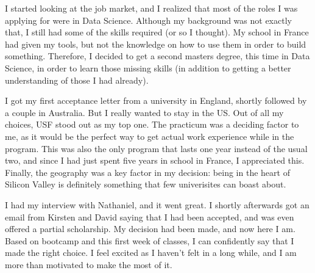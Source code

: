\documentclass[]{article}
\begin{document}
I started looking at the job market, and I realized that most of the roles I was applying for were in Data Science. Although my background was not exactly that, I still had some of the skills required (or so I thought). My school in France had given my tools, but not the knowledge on how to use them in order to build something. Therefore, I decided to get a second masters degree, this time in Data Science, in order to learn those missing skills (in addition to getting a better understanding of those I had already).

I got my first acceptance letter from a university in England, shortly followed by a couple in Australia. But I really wanted to stay in the US. Out of all my choices, USF stood out as my top one. The practicum was a deciding factor to me, as it would be the perfect way to get actual work experience while in the program. This was also the only program that lasts one year instead of the usual two, and since I had just spent five years in school in France, I appreciated this. Finally, the geography was a key factor in my decision: being in the heart of Silicon Valley is definitely something that few univerisites can boast about.

I had my interview with Nathaniel, and it went great. I shortly afterwards got an email from Kirsten and David saying that I had been accepted, and was even offered a partial scholarship. My decision had been made, and now here I am. Based on bootcamp and this first week of classes, I can confidently say that I made the right choice. I feel excited as I haven't felt in a long while, and I am more than motivated to make the most of it.
\end{document}
